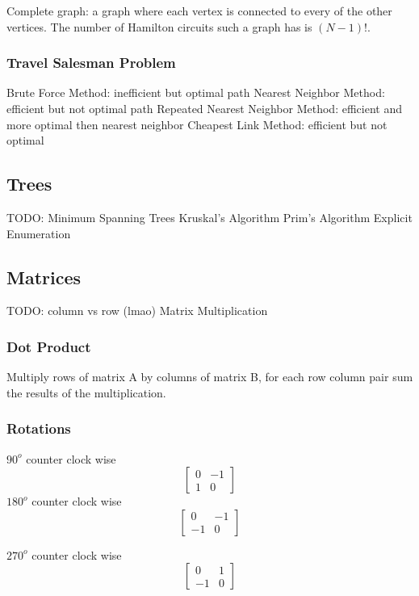 \documentclass{article}
\begin{document}
Complete graph: a graph where each vertex is connected to every of the other vertices. The number of Hamilton circuits such a graph has is $(N - 1)!$.

\subsubsection{Travel Salesman Problem}
Brute Force Method: inefficient but optimal path
Nearest Neighbor Method: efficient but not optimal path
Repeated Nearest Neighbor Method: efficient and more optimal then nearest neighbor
Cheapest Link Method: efficient but not optimal

\subsection{Trees}
TODO: Minimum Spanning Trees
Kruskal's Algorithm
Prim's Algorithm
Explicit Enumeration


\subsection{Matrices}
TODO: column vs row (lmao)
Matrix Multiplication
\subsubsection{Dot Product}
Multiply rows of matrix A by columns of matrix B, for each row column pair sum the results of the multiplication.

\subsubsection{Rotations}
$90^o$ counter clock wise
\begin{equation}
\begin{bmatrix}
   0  &  -1 \\
   1  &   0
\end{bmatrix}
\end{equation}
$180^o$ counter clock wise
\begin{equation}
\begin{bmatrix}
   0  &  -1 \\
   -1  &   0
\end{bmatrix}
\end{equation}

$270^o$ counter clock wise
\begin{equation}
\begin{bmatrix}
   0  &  1 \\
   -1  &   0
\end{bmatrix}
\end{equation}
\end{document}
